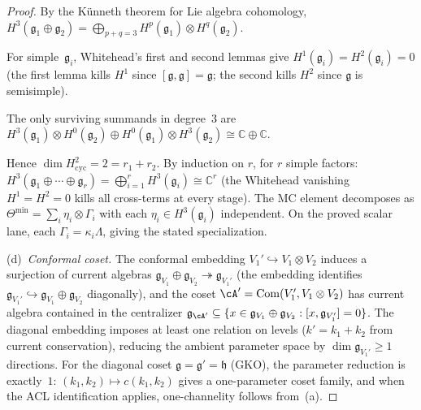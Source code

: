 \begin{proof}
By the K\"unneth theorem for Lie algebra cohomology,
$H^3(\mathfrak{g}_1 \oplus \mathfrak{g}_2)
= \bigoplus_{p+q=3} H^p(\mathfrak{g}_1) \otimes
H^q(\mathfrak{g}_2)$.

For simple~$\mathfrak{g}_i$, Whitehead's first and second
lemmas give $H^1(\mathfrak{g}_i) = H^2(\mathfrak{g}_i) = 0$
(the first lemma kills $H^1$ since
$[\mathfrak{g},\mathfrak{g}] = \mathfrak{g}$;
the second kills $H^2$ since $\mathfrak{g}$ is
semisimple).

The only surviving summands in degree~$3$ are
$H^3(\mathfrak{g}_1) \otimes H^0(\mathfrak{g}_2)
\oplus H^0(\mathfrak{g}_1) \otimes H^3(\mathfrak{g}_2)
\cong \mathbb{C} \oplus \mathbb{C}$.

Hence
$\dim H^2_{\mathrm{cyc}} = 2 = r_1 + r_2$.
By induction on $r$, for $r$ simple factors:
$H^3(\mathfrak{g}_1 \oplus \cdots \oplus \mathfrak{g}_r)
= \bigoplus_{i=1}^r H^3(\mathfrak{g}_i) \cong
\mathbb{C}^r$ (the Whitehead vanishing
$H^1 = H^2 = 0$ kills all cross-terms at every stage).
The MC element decomposes as
$\Theta^{\min} = \sum_i \eta_i \otimes \Gamma_i$
with each $\eta_i \in H^3(\mathfrak{g}_i)$ independent.
On the proved scalar lane, each
$\Gamma_i = \kappa_i \Lambda$, giving the stated specialization.

\smallskip\noindent
(d)~\emph{Conformal coset.}
The conformal embedding
$V_1' \hookrightarrow V_1 \otimes V_2$ induces a surjection
of current algebras
$\mathfrak{g}_{V_1} \oplus \mathfrak{g}_{V_2}
\twoheadrightarrow \mathfrak{g}_{V_1'}$
(the embedding identifies
$\mathfrak{g}_{V_1'} \hookrightarrow
\mathfrak{g}_{V_1} \oplus \mathfrak{g}_{V_2}$ diagonally),
and the coset $\cA' = \mathrm{Com}(V_1', V_1 \otimes V_2)$
has current algebra contained in the centralizer
$\mathfrak{g}_{\cA'} \subseteq
\{x \in \mathfrak{g}_{V_1} \oplus \mathfrak{g}_{V_2}
: [x, \mathfrak{g}_{V_1'}] = 0\}$.
The diagonal embedding imposes at least one relation on
levels ($k' = k_1 + k_2$ from current conservation),
reducing the ambient parameter space by
$\dim \mathfrak{g}_{V_1'} \geq 1$ directions.
For the diagonal coset
$\mathfrak{g} = \mathfrak{g}' = \mathfrak{h}$ (GKO), the
parameter reduction is exactly~$1$:
$(k_1, k_2) \mapsto c(k_1, k_2)$ gives
a one-parameter coset family, and when the ACL identification
applies, one-channelity follows from~(a).
\end{proof}

